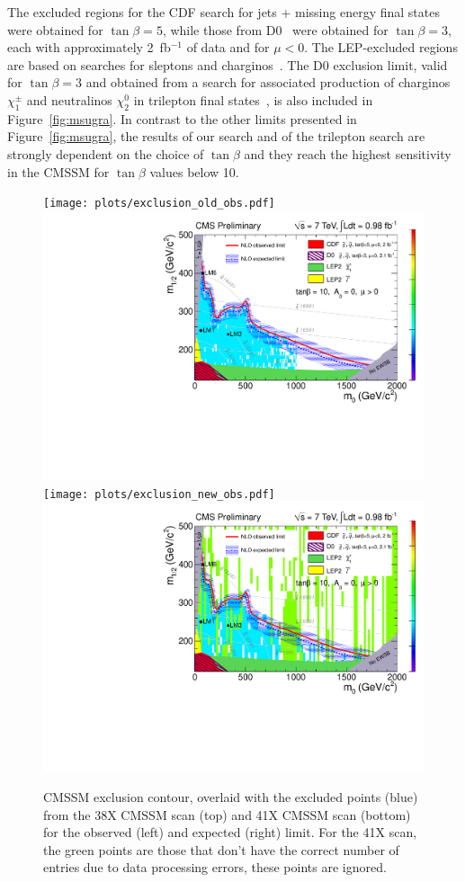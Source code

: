 The excluded regions  for the CDF
search for  jets + missing  energy final states~\cite{PhysRevLett.102.121801} were
obtained for $\tan\beta=5$, while those from D0~\cite{Abazov2008449} were obtained for 
$\tan\beta=3$, each with  approximately  2~fb$^{-1}$ of  data and for $\mu < 0$. 
The  LEP-excluded
regions  are based  on searches  for  sleptons and  charginos~\cite{LEPSUSY}.  
The D0 exclusion limit, valid for $\tan\beta=3$  and obtained from
a  search  for  associated  production   of  charginos $\chi_{1}^{\pm}$ and
neutralinos $\chi_2^0$ in  trilepton final states~\cite{Abazov200934}, is also
included  in Figure~\ref{fig:msugra}. In  contrast to  the other  limits  presented in
Figure~\ref{fig:msugra},  the results of our search and of the  trilepton search are  strongly dependent on
the choice  of $\tan\beta$ and  they reach the  highest sensitivity  in the
CMSSM for $\tan\beta$ values below 10.

\begin{figure}[hbt]
\begin{center}
\texttt{[image: plots/exclusion\_old\_obs.pdf]}
\includegraphics[width=0.48\linewidth]{plots/exclusion_old_exp.pdf}
\texttt{[image: plots/exclusion\_new\_obs.pdf]}
\includegraphics[width=0.48\linewidth]{plots/exclusion_new_exp.pdf}
\caption{\label{fig:dilmass}\protect 
CMSSM exclusion contour, overlaid with the excluded points (blue) from the 38X CMSSM scan (top)
and 41X CMSSM scan (bottom) for the observed (left) and expected (right) limit.
For the 41X scan, the green points are those that don't have the correct number of entries due
to data processing errors, these points are ignored.
}
\end{center}
\end{figure}


